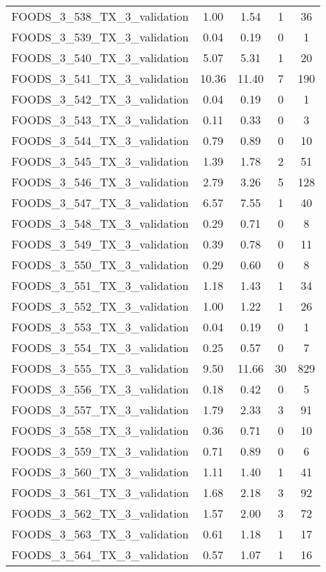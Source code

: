 \begin{table}
\begin{tabular}{|l|c|c|c|c|}
FOODS\_3\_538\_TX\_3\_validation & 1.00 & 1.54 & 1 & 36 \\
FOODS\_3\_539\_TX\_3\_validation & 0.04 & 0.19 & 0 & 1 \\
FOODS\_3\_540\_TX\_3\_validation & 5.07 & 5.31 & 1 & 20 \\
FOODS\_3\_541\_TX\_3\_validation & 10.36 & 11.40 & 7 & 190 \\
FOODS\_3\_542\_TX\_3\_validation & 0.04 & 0.19 & 0 & 1 \\
FOODS\_3\_543\_TX\_3\_validation & 0.11 & 0.33 & 0 & 3 \\
FOODS\_3\_544\_TX\_3\_validation & 0.79 & 0.89 & 0 & 10 \\
FOODS\_3\_545\_TX\_3\_validation & 1.39 & 1.78 & 2 & 51 \\
FOODS\_3\_546\_TX\_3\_validation & 2.79 & 3.26 & 5 & 128 \\
FOODS\_3\_547\_TX\_3\_validation & 6.57 & 7.55 & 1 & 40 \\
FOODS\_3\_548\_TX\_3\_validation & 0.29 & 0.71 & 0 & 8 \\
FOODS\_3\_549\_TX\_3\_validation & 0.39 & 0.78 & 0 & 11 \\
FOODS\_3\_550\_TX\_3\_validation & 0.29 & 0.60 & 0 & 8 \\
FOODS\_3\_551\_TX\_3\_validation & 1.18 & 1.43 & 1 & 34 \\
FOODS\_3\_552\_TX\_3\_validation & 1.00 & 1.22 & 1 & 26 \\
FOODS\_3\_553\_TX\_3\_validation & 0.04 & 0.19 & 0 & 1 \\
FOODS\_3\_554\_TX\_3\_validation & 0.25 & 0.57 & 0 & 7 \\
FOODS\_3\_555\_TX\_3\_validation & 9.50 & 11.66 & 30 & 829 \\
FOODS\_3\_556\_TX\_3\_validation & 0.18 & 0.42 & 0 & 5 \\
FOODS\_3\_557\_TX\_3\_validation & 1.79 & 2.33 & 3 & 91 \\
FOODS\_3\_558\_TX\_3\_validation & 0.36 & 0.71 & 0 & 10 \\
FOODS\_3\_559\_TX\_3\_validation & 0.71 & 0.89 & 0 & 6 \\
FOODS\_3\_560\_TX\_3\_validation & 1.11 & 1.40 & 1 & 41 \\
FOODS\_3\_561\_TX\_3\_validation & 1.68 & 2.18 & 3 & 92 \\
FOODS\_3\_562\_TX\_3\_validation & 1.57 & 2.00 & 3 & 72 \\
FOODS\_3\_563\_TX\_3\_validation & 0.61 & 1.18 & 1 & 17 \\
FOODS\_3\_564\_TX\_3\_validation & 0.57 & 1.07 & 1 & 16 \\

\end{tabular}
\end{table}
